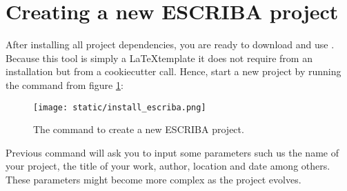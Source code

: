 \section{Creating a new ESCRIBA project}

After installing all project dependencies, you are ready to download and use
\ESCRIBA. Because this tool is simply a \LaTeX template it does not require from
an installation but from a cookiecutter call. Hence, start a new \ESCRIBA
project by running the command from figure \ref{fig:installing_escriba}:


\begin{figure}[h]
  \centering
  \texttt{[image: static/install\_escriba.png]}
  \caption{The command to create a new ESCRIBA project.}
  \label{fig:installing_escriba}
\end{figure}

Previous command will ask you to input some parameters such us the name of your
project, the title of your work, author, location and date among others. These
parameters might become more complex as the project evolves.
